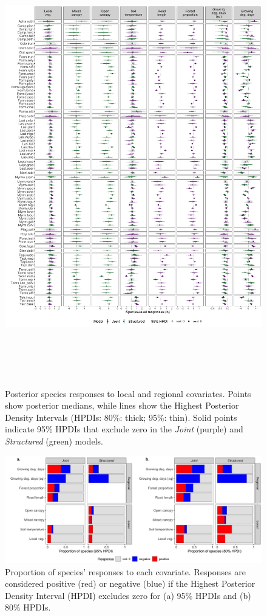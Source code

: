 \documentclass[preprint,review,times,12pt,3p]{elsarticle}
\begin{document}
\begin{figure}
	\centering\includegraphics[height=7.5in]{../../../ms/1_Ecography/1/figs/b_opt_byParam.png}
	\caption{\label{fig:b_byParam} Posterior species responses to local and regional covariates. Points show posterior medians, while lines show the Highest Posterior Density Intervals (HPDIs: 80\%: thick; 95\%: thin). Solid points indicate 95\% HPDIs that exclude zero in the \emph{Joint} (purple) and \emph{Structured} (green) models.}
\end{figure}

\begin{figure}
	\centering\includegraphics[width=6.5in]{../../../ms/1_Ecography/1/figs/b_opt_bar.png}
	\caption{\label{fig:b_bars} Proportion of species' responses to each covariate. Responses are considered positive (red) or negative (blue) if the Highest Posterior Density Interval (HPDI) excludes zero for (a) 95\% HPDIs and (b) 80\% HPDIs. }
\end{figure}
\end{document}
